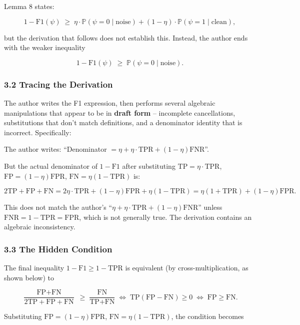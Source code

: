 \documentclass[
  12pt,
]{ctexart}
\begin{document}
Lemma 8 states:

\[1 - \text{F1}(\psi) \;\geq\; \eta \cdot \mathbb{P}(\psi=0 \mid \text{noise}) + (1-\eta) \cdot \mathbb{P}(\psi=1 \mid \text{clean}),\]

but the derivation that follows does not establish this. Instead, the
author ends with the weaker inequality

\[1 - \text{F1}(\psi) \;\geq\; \mathbb{P}(\psi=0 \mid \text{noise}).\]

\subsubsection{3.2 Tracing the Derivation}\label{tracing-the-derivation}

The author writes the F1 expression, then performs several algebraic
manipulations that appear to be in \textbf{draft form} -- incomplete
cancellations, substitutions that don't match definitions, and a
denominator identity that is incorrect. Specifically:

The author writes: ``Denominator
\(= \eta + \eta\cdot\text{TPR} + (1-\eta)\text{FNR}\)''.

But the actual denominator of \(1-\text{F1}\) after substituting
\(\text{TP} = \eta\cdot\text{TPR}\), \(\text{FP} = (1-\eta)\text{FPR}\),
\(\text{FN} = \eta(1-\text{TPR})\) is:

\[2\text{TP} + \text{FP} + \text{FN} = 2\eta\cdot\text{TPR} + (1-\eta)\text{FPR} + \eta(1-\text{TPR}) = \eta(1+\text{TPR}) + (1-\eta)\text{FPR}.\]

This does not match the author's
``\(\eta + \eta\cdot\text{TPR} + (1-\eta)\text{FNR}\)'' unless
\(\text{FNR} = 1-\text{TPR} = \text{FPR}\), which is not generally true.
The derivation contains an algebraic inconsistency.

\subsubsection{3.3 The Hidden Condition}\label{the-hidden-condition}

The final inequality \(1-\text{F1} \geq 1-\text{TPR}\) is equivalent (by
cross-multiplication, as shown below) to

\[\frac{\text{FP}+\text{FN}}{2\text{TP}+\text{FP}+\text{FN}} \;\geq\; \frac{\text{FN}}{\text{TP}+\text{FN}} \;\iff\; \text{TP}(\text{FP} - \text{FN}) \geq 0 \;\iff\; \text{FP} \geq \text{FN}.\]

Substituting \(\text{FP} = (1-\eta)\text{FPR}\),
\(\text{FN} = \eta(1-\text{TPR})\), the condition becomes
\end{document}
